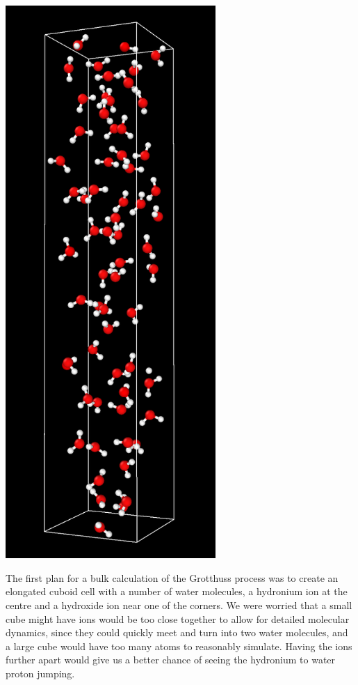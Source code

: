 \documentclass{article}
\newenvironment{Figure}{\par\medskip\noindent\minipage{\linewidth}}{\endminipage\par\medskip}
\begin{document}
\begin{multicols}{2}
\begin{Figure}
	\centering
	\includegraphics[width=0.6\textwidth]{figures/64}
	\label{fig:LongBox}	
\end{Figure}
The first plan for a bulk calculation of the Grotthuss process was to create an elongated cuboid cell with a number of water molecules, a hydronium ion at the centre and a hydroxide ion near one of the corners. We were worried that a small cube might have ions would be too close together to allow for detailed molecular dynamics, since they could quickly meet and turn into two water molecules, and a large cube would have too many atoms to reasonably simulate. Having the ions further apart would give us a better chance of seeing the hydronium to water proton jumping.


\end{multicols}
\end{document}
